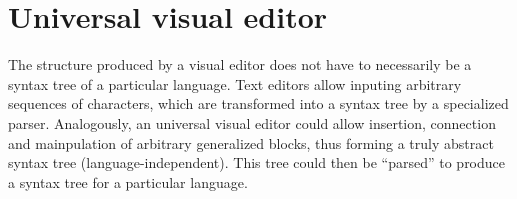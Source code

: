 \section{Universal visual editor}
The structure produced by a visual editor does not have to necessarily be a syntax tree of a particular language.
Text editors allow inputing arbitrary sequences of characters, which are transformed into a syntax tree by a specialized parser. Analogously, an universal visual editor could allow insertion, connection and mainpulation of arbitrary generalized blocks, thus forming a truly abstract syntax tree (language-independent). This tree could then be ``parsed'' to produce a syntax tree for a particular language.